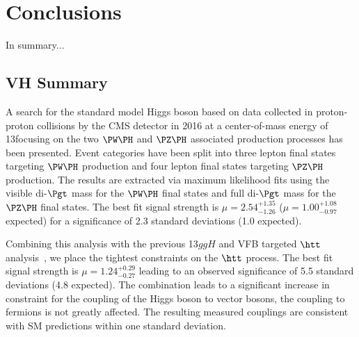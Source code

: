 \chapter{Conclusions}

In summary...


\section{VH Summary}
A search for the standard model Higgs boson based on data collected in proton-proton collisions by the
CMS detector in 2016 at a center-of-mass energy of 13\TeV focusing on the
two $\PW\PH$ and $\PZ\PH$ associated production processes has been presented. Event
categories have been split into three lepton final states targeting $\PW\PH$ production
and four lepton final states targeting $\PZ\PH$ production. The results are extracted
via maximum likelihood fits using the visible di-$\Pgt$ mass for the $\PW\PH$
final states and full di-$\Pgt$ mass for the $\PZ\PH$ final states. 
The best fit signal
strength is $\mu = 2.54 ^{+1.35} _{-1.26}$ ($\mu = 1.00 ^{+1.08} _{-0.97}$ expected) 
for a significance of 2.3 standard deviations (1.0 expected).

Combining this analysis with the previous 13\TeV $ggH$ and VFB targeted $\htt$ 
analysis~\cite{cms_13TeV_htt_jhep_2017}, we place the tightest constraints
on the $\htt$ process. 
The best fit signal strength is $\mu = 1.24 ^{+0.29} _{-0.27}$ leading to an
observed significance of 5.5 standard deviations (4.8 expected). 
The combination leads to a significant increase in constraint for the coupling
of the Higgs boson to vector bosons, the coupling to fermions is not greatly
affected. The resulting measured couplings are consistent with SM predictions
within one standard deviation.
